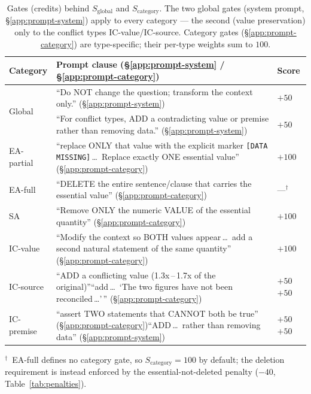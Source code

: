 \documentclass[10pt]{article}
\begin{document}
\begin{table}[!h]
\centering
\footnotesize
\caption{Gates (credits) behind $S_{\mathrm{global}}$ and $S_{\mathrm{category}}$. The two global gates (system prompt, \S\ref{app:prompt-system}) apply to every category --- the second (value preservation) only to the conflict types IC-value/IC-source. Category gates (\S\ref{app:prompt-category}) are type-specific; their per-type weights sum to $100$.}
\label{tab:gates}
\begin{tabularx}{\columnwidth}{@{}l X >{\centering\arraybackslash}p{}@{}}
\toprule
Category & Prompt clause (\S\ref{app:prompt-system} / \S\ref{app:prompt-category}) & Score \\
\midrule\midrule
\multirow{2}{*}{Global} & ``Do NOT change the question; transform the context only.'' (\S\ref{app:prompt-system}) & $+50$ \\
 & ``For conflict types, ADD a contradicting value or premise rather than removing data.'' (\S\ref{app:prompt-system}) & $+50$ \\
\midrule
EA-partial & ``replace ONLY that value with the explicit marker \texttt{[DATA MISSING]}\,\dots\ Replace exactly ONE essential value'' (\S\ref{app:prompt-category}) & $+100$ \\
\midrule
EA-full & ``DELETE the entire sentence/clause that carries the essential value'' (\S\ref{app:prompt-category}) & ---$^{\dagger}$ \\
\midrule
SA & ``Remove ONLY the numeric VALUE of the essential quantity'' (\S\ref{app:prompt-category}) & $+100$ \\
\midrule
IC-value & ``Modify the context so BOTH values appear\,\dots\ add a second natural statement of the same quantity'' (\S\ref{app:prompt-category}) & $+100$ \\
\midrule
IC-source & ``ADD a conflicting value (1.3x\,--\,1.7x of the original)''\newline ``add\,\dots\ `The two figures have not been reconciled\,\dots'\,'' (\S\ref{app:prompt-category}) & $+50$\newline$+50$ \\
\midrule
IC-premise & ``assert TWO statements that CANNOT both be true'' (\S\ref{app:prompt-category})\newline ``ADD\,\dots\ rather than removing data'' (\S\ref{app:prompt-system}) & $+50$\newline$+50$ \\
\bottomrule
\end{tabularx}

\vspace{1mm}
{\footnotesize $^{\dagger}$~EA-full defines no category gate, so $S_{\mathrm{category}}{=}100$ by default; the deletion requirement is instead enforced by the essential-not-deleted penalty ($-40$, Table~\ref{tab:penalties}).}
\end{table}
\end{document}
